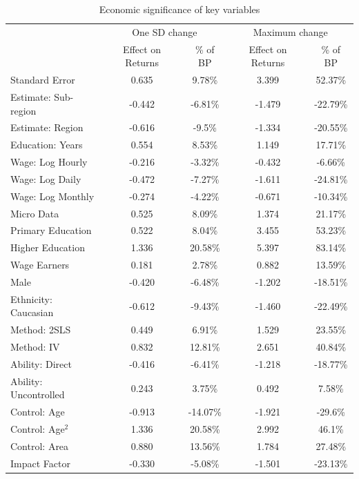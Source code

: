 \begin{table}[!htbp]
   \centering
   \scriptsize
   \singlespace
   \caption{Economic significance of key variables} 
   \label{tab:econ_significance}
   \begin{tabular}{
   @{}
   l
   *{4}{c}
   @{}}
   \toprule
    & \multicolumn{2}{c}{One SD change} & \multicolumn{2}{c}{Maximum change}\\
    & Effect on Returns & \% of BP & Effect on Returns & \% of BP \\
   \midrule
   Standard Error & 0.635 & 9.78\% & 3.399 & 52.37\% \\
   Estimate: Sub-region & -0.442 & -6.81\% & -1.479 & -22.79\% \\
   Estimate: Region & -0.616 & -9.5\% & -1.334 & -20.55\% \\
   Education: Years & 0.554 & 8.53\% & 1.149 & 17.71\% \\
   Wage: Log Hourly & -0.216 & -3.32\% & -0.432 & -6.66\% \\
   Wage: Log Daily & -0.472 & -7.27\% & -1.611 & -24.81\% \\
   Wage: Log Monthly & -0.274 & -4.22\% & -0.671 & -10.34\% \\
   Micro Data & 0.525 & 8.09\% & 1.374 & 21.17\% \\
   Primary Education & 0.522 & 8.04\% & 3.455 & 53.23\% \\
   Higher Education & 1.336 & 20.58\% & 5.397 & 83.14\% \\
   Wage Earners & 0.181 & 2.78\% & 0.882 & 13.59\% \\
   Male & -0.420 & -6.48\% & -1.202 & -18.51\% \\
   Ethnicity: Caucasian & -0.612 & -9.43\% & -1.460 & -22.49\% \\
   Method: 2SLS & 0.449 & 6.91\% & 1.529 & 23.55\% \\
   Method: IV & 0.832 & 12.81\% & 2.651 & 40.84\% \\
   Ability: Direct & -0.416 & -6.41\% & -1.218 & -18.77\% \\
   Ability: Uncontrolled & 0.243 & 3.75\% & 0.492 & 7.58\% \\
   Control: Age & -0.913 & -14.07\% & -1.921 & -29.6\% \\
   Control: Age$^2$ & 1.336 & 20.58\% & 2.992 & 46.1\% \\
   Control: Area & 0.880 & 13.56\% & 1.784 & 27.48\% \\
   Impact Factor & -0.330 & -5.08\% & -1.501 & -23.13\% \\

\end{tabular}
\end{table}
